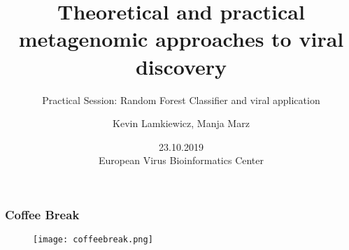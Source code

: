 

\title{Theoretical and practical metagenomic approaches to viral discovery}
\subtitle{Practical Session: Random Forest Classifier and viral application}
\author{Kevin Lamkiewicz, Manja Marz}
\date{23.10.2019\\[1em]European Virus Bioinformatics Center}



\begin{frame}
  \maketitle
\end{frame}



\beginbackup

\begin{frame}[c]\frametitle{Coffee Break}
  \begin{figure}[htbp]
    \centering
    \texttt{[image: coffeebreak.png]}
  \end{figure}
\end{frame}

\backupend

